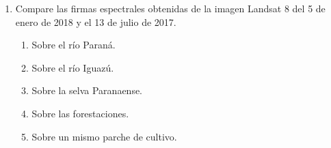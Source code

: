 \begin{enumerate}
  \item Compare las firmas espectrales obtenidas de la imagen Landsat 8 del 5 de enero de 2018 y el 13 de julio de 2017.
  \begin{enumerate}
    \item Sobre el río Paraná.
    \item Sobre el río Iguazú.
    \item Sobre la selva Paranaense.
    \item Sobre las forestaciones.
    \item Sobre un mismo parche de cultivo.
  \end{enumerate}
\end{enumerate}
